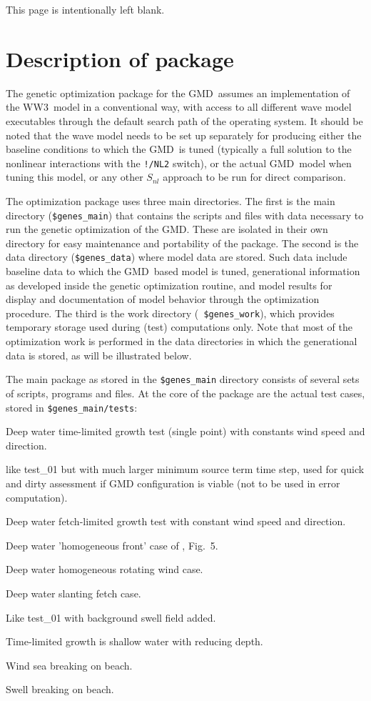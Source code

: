 \documentclass[12pt]{article}
\newcommand{\ws}{WW3}
\newcommand{\gmd}{GMD}
\newcommand{\file}{\sf}
\newcommand{\code}{\tt}
\newcommand{\pb}{\strut \vfill \pagebreak}
\newcommand{\bpage}{\vfill \pagebreak \strut

\vspace{2.5in} \centerline{This page is intentionally left blank.}}
\newcommand{\newsec}{\setcounter{equation}{0}
                      \setcounter{myfigno}{0}
                      \setcounter{mytabno}{0}}
\newenvironment{flist}{\begin{list}{nofile ?}{\parsep 0mm
            \itemsep 0mm \leftmargin 35mm \labelwidth 25mm
            \rightmargin 10mm}}{\end{list}}
\newcommand{\fit}[2]{\item[{\file{#1}}\hfill]{#2}}
\newcounter{myfigno}[section]
\newcounter{mytabno}[section]
\begin{document}
\bpage
\pb
\section{Description of package} \label{sec:pack_desc}
\newsec

The genetic optimization package for the \gmd\ assumes an implementation of
the \ws\ model in a conventional way, with access to all different wave model
executables through the default search path of the operating system. It should
be noted that the wave model needs to be set up separately for producing
either the baseline conditions to which the \gmd\ is tuned (typically a full
solution to the nonlinear interactions with the {\code !/NL2} switch), or the
actual \gmd\ model when tuning this model, or any other $S_{nl}$ approach to
be run for direct comparison.

The optimization package uses three main directories.  The first is the main
directory ({\code \$genes\_main}) that contains the scripts and files with
data necessary to run the genetic optimization of the \gmd. These are isolated
in their own directory for easy maintenance and portability of the package.
The second is the data directory ({\code \$genes\_data}) where model data are
stored. Such data include baseline data to which the \gmd\ based model is
tuned, generational information as developed inside the genetic optimization
routine, and model results for display and documentation of model behavior
through the optimization procedure.  The third is the work directory ({\code
\$genes\_work}), which provides temporary storage used during (test)
computations only. Note that most of the optimization work is performed in the
data directories in which the generational data is stored, as will be
illustrated below.

The main package as stored in the {\code \$genes\_main} directory consists of
several sets of scripts, programs and files. At the core of the package are
the actual test cases, stored in {\code \$genes\_main/tests}:

\begin{flist}
\fit{test\_01}{Deep water time-limited growth test (single point) with
               constants wind speed and direction.}
\fit{test\_0X}{like {\file test\_01} but with much larger minimum source term
               time step, used for quick and dirty assessment if GMD
               configuration is viable (not to be used in error computation).}
\fit{test\_02}{Deep water fetch-limited growth test with constant wind speed
               and direction.}
\fit{test\_03}{Deep water 'homogeneous front' case of \cite{tol:JPO92},
               Fig.~5.} 
\fit{test\_04}{Deep water homogeneous rotating wind case.}
\fit{test\_05}{Deep water slanting fetch case.}
\fit{test\_06}{Like {\file test\_01} with background swell field added.}
\fit{test\_11}{Time-limited growth is shallow water with reducing depth.}
\fit{test\_12}{Wind sea breaking on beach.}
\fit{test\_13}{Swell breaking on beach.}
\end{flist}
\end{document}
